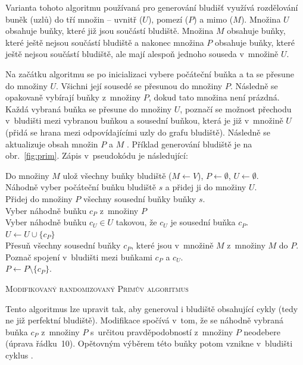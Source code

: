 \documentclass[a4paper,12pt]{article}
\begin{document}
Varianta tohoto algoritmu používaná pro generování bludišť využívá rozdělování buněk (uzlů) do tří množin -- uvnitř ($U$), pomezí ($P$) a mimo ($M$).
Množina $U$ obsahuje buňky, které již jsou součástí bludiště. Množina $M$ obsahuje buňky, které ještě nejsou součástí bludiště a 
nakonec množina $P$ obsahuje buňky, které ještě nejsou součástí bludiště, ale mají alespoň jednoho souseda v~množině $U$.

Na začátku algoritmu se po inicializaci vybere počáteční buňka a ta se přesune do množiny $U$. Všichni její sousedé se přesunou do množiny $P$.
Následně se opakovaně vybírají buňky z~množiny $P$, dokud tato množina není prázdná. Každá vybraná buňka se přesune do množiny $U$, 
poznačí se možnost přechodu v~bludišti mezi vybranou buňkou a sousední buňkou, která je již v~množině $U$ (přidá se hrana mezi odpovídajícími 
uzly do grafu bludiště). Následně se aktualizuje obsah množin $P$ a $M$ \cite{mat,fol}. Příklad generování bludiště je na obr.~\ref{fig:prim}. 
Zápis v~pseudokódu je následující:

\medskip

 \begin{algorithm}[H]
 \SetNlSty{}{}{:}
 \SetNlSkip{-1.0em}
 \SetInd{0.5em}{0.5em}
 \BlankLine
 \Indentp{1.7em}
   Do množiny $M$ ulož všechny buňky bludiště ($M\gets V$), $P \gets \emptyset$, $U \gets \emptyset$. \\
   Náhodně vyber počáteční buňku bludiště $s$ a přidej ji do množiny $U$.\\
   Přidej do množiny $P$ všechny sousední buňky buňky $s$. \\
   {
     Vyber náhodně buňku $c_P$ z~množiny $P$ \\
     Vyber náhodně buňku $c_U \in U$ takovou, že $c_U$ je sousední buňka $c_P$. \\
     $U \gets U \cup \{ c_P \}$ \\
     Přesuň všechny sousední buňky $c_P$, které jsou v~množině $M$ z~množiny $M$ do $P$. \\
     Poznač spojení v~bludišti mezi buňkami $c_P$ a $c_U$. \\
     $P \gets P \setminus \{ c_P \} $.
     }
 \caption{\textsc{Modifikovaný randomizovaný Primův algoritmus}}
 \label{alg:prim}
\end{algorithm}

\medskip
Tento algoritmus lze upravit tak, aby generoval i bludiště obsahující cykly (tedy ne již perfektní bludiště). 
Modifikace spočívá v~tom, že se náhodně vybraná buňka $c_P$ z~množiny $P$ s~určitou pravděpodobností 
z~množiny $P$ neodebere (úprava řádku~10). Opětovným výběrem této buňky potom vznikne v~bludišti cyklus \cite{mat}.
\end{document}
